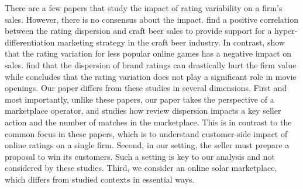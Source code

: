 \documentclass[msom,blindrev]{informs3}
\begin{document}
	
	There are a few papers that study the impact of rating variability on a firm's sales. However, there is no consensus
	about the impact. \cite{clemons2006online} find a positive correlation between the rating dispersion and craft beer sales to provide support for a hyper-differentiation marketing strategy in the craft beer industry. In contrast, \cite{Zhu} show that the rating variation for less popular online games has a negative impact on sales. \cite{luo2013impact} find that the dispersion of brand ratings can drastically hurt the firm value while \cite{zhang2006tapping} concludes that the rating variation does not play a significant role in movie openings. Our paper differs from these studies in several dimensions. First and most importantly, unlike these papers, our paper takes the perspective of a marketplace operator, and studies how review dispersion impacts a key seller action and the number of matches in the marketplace. This is in contrast to the common focus in these papers, which is to understand customer-side impact of online ratings on a single firm. Second, in our setting, the seller must prepare a proposal to win its customers. Such a setting is key to our analysis and not considered by these studies. Third, we consider an online solar marketplace, which differs from studied contexts in essential ways.
	
	
	
\end{document}
